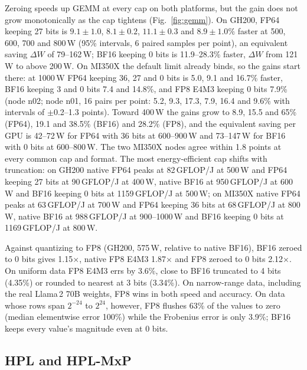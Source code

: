 \documentclass[conference]{IEEEtran}
\newcommand{\W}{\,W}
\newcommand{\pct}{\%}
\begin{document}
Zeroing speeds up GEMM at every cap on both platforms, but the gain does not grow monotonically as the cap tightens
(Fig.~\ref{fig:gemm}). On GH200, FP64 keeping 27 bits is $9.1\pm1.0$, $8.1\pm0.2$, $11.1\pm0.3$ and $8.9\pm1.0\pct$
faster at 500, 600, 700 and 800\W{} (95\pct{} intervals, 6 paired samples per point), an equivalent saving $\Delta W$ of
79--162\W; BF16 keeping 0 bits is 11.9--28.3\pct{} faster, $\Delta W$ from 121\W{} to above 200\W. On MI350X the
default limit already binds, so the gains start there: at 1000\W{} FP64 keeping 36, 27 and 0 bits is 5.0, 9.1 and
16.7\pct{} faster, BF16 keeping 3 and 0 bits 7.4 and 14.8\pct, and FP8 E4M3 keeping 0 bits 7.9\pct{} (node n02;
node n01, 16 pairs per point: 5.2, 9.3, 17.3, 7.9, 16.4 and 9.6\pct{} with intervals of $\pm$0.2--1.3 points). Toward
400\W{} the gains grow to 8.9, 15.5 and 65\pct{} (FP64), 19.1 and 38.5\pct{} (BF16) and 28.2\pct{} (FP8), and the equivalent
saving per GPU is 42--72\W{} for FP64 with 36 bits at 600--900\W{} and 73--147\W{} for BF16 with 0 bits at 600--800\W. The two MI350X
nodes agree within 1.8 points at every common cap and format. The most energy-efficient cap shifts with truncation:
on GH200 native FP64 peaks at 82\,GFLOP/J at 500\W{} and FP64 keeping 27 bits at 90\,GFLOP/J at 400\W, native BF16
at 950\,GFLOP/J at 600\W{} and BF16 keeping 0 bits at 1159\,GFLOP/J at 500\W; on MI350X native FP64 peaks at
63\,GFLOP/J at 700\W{} and FP64 keeping 36 bits at 68\,GFLOP/J at 800\W, native BF16 at 988\,GFLOP/J at
900--1000\W{} and BF16 keeping 0 bits at 1169\,GFLOP/J at 800\W.

Against quantizing to FP8 (GH200, 575\W, relative to native BF16), BF16 zeroed to 0 bits gives 1.15$\times$, native FP8
E4M3 1.87$\times$ and FP8 zeroed to 0 bits 2.12$\times$. On uniform data FP8 E4M3 errs by 3.6\pct, close to
BF16 truncated to 4 bits (4.35\pct) or rounded to nearest at 3 bits (3.34\pct). On narrow-range data, including
the real Llama\,2 70B weights, FP8 wins in both speed and accuracy. On data whose rows span $2^{-24}$ to $2^{24}$,
however, FP8 flushes 63\pct{} of the values to zero (median elementwise error 100\pct) while the Frobenius error is
only 3.9\pct; BF16 keeps every value's magnitude even at 0 bits.

\subsection{HPL and HPL-MxP}\label{sec:hpl}
\end{document}
